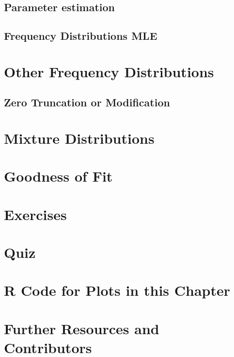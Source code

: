 \documentclass[]{book}
\theoremstyle{definition}
\theoremstyle{definition}
\theoremstyle{definition}
\theoremstyle{remark}
\begin{document}
\subsection{Parameter estimation}\label{S:parameter-estimation}

\subsection{Frequency Distributions
MLE}\label{S:frequency-distributions-mle}

\section{Other Frequency
Distributions}\label{S:other-frequency-distributions}

\subsection{Zero Truncation or
Modification}\label{S:zero-truncation-or-modification}

\section{Mixture Distributions}\label{S:mixture-distributions}

\section{Goodness of Fit}\label{S:goodness-of-fit}

\section{Exercises}\label{S:exercises}

\section{Quiz}\label{S:quiz}

\section{R Code for Plots in this
Chapter}\label{r-code-for-plots-in-this-chapter}

\section{Further Resources and
Contributors}\label{Freq-further-reading-and-resources}
\end{document}
